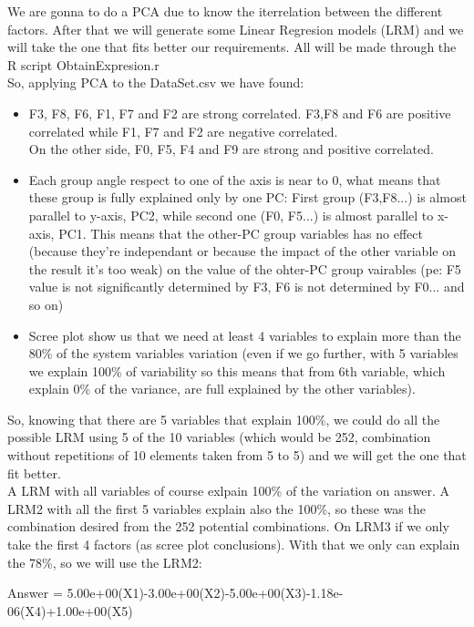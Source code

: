 \documentclass[12pt]{article}
\begin{document}
We are gonna to do a PCA due to know the iterrelation between the different factors. After that we will generate some Linear Regresion models (LRM) and we will take the one that fits better our requirements. All will be made through the R script ObtainExpresion.r\\
So, applying PCA to the DataSet.csv we have found:
\begin{itemize}
\item F3, F8, F6, F1, F7 and F2 are strong correlated. F3,F8 and F6 are positive correlated while F1, F7 and F2 are negative correlated.\\ On the other side, F0, F5, F4 and F9 are strong and positive correlated.
\item Each group angle respect to one of the axis is near to 0, what means that these group is fully explained only by one PC: First group (F3,F8...) is almost parallel to y-axis, PC2, while second one (F0, F5...) is almost parallel to x-axis, PC1. 
This means that the other-PC group variables has no effect (because they're independant or because the impact of the other variable on the result it's too weak) on the value of the ohter-PC group vairables (pe: F5 value is not significantly determined by F3, F6 is not determined by F0... and so on)
\item Scree plot show us that we need at least 4 variables to explain more than the 80\% of the system variables variation (even if we go further, with 5 variables we explain 100\% of variability so this means that from 6th variable, which explain 0\% of the variance, are full explained by the other variables).
\end{itemize}
So, knowing that there are 5 variables that explain 100\%, we could do all the possible LRM using 5 of the 10 variables (which would be 252, combination without repetitions of 10 elements taken from 5 to 5) and we will get the one that fit better. \\

A LRM with all variables of course exlpain 100\% of the variation on answer.
A LRM2 with all the first 5 variables explain also the 100\%, so these was the combination desired from the 252 potential combinations.
On LRM3 if we only take the first 4 factors (as scree plot conclusions). With that we only can explain the 78\%, so we will use the LRM2:

Answer = 5.00e+00(X1)-3.00e+00(X2)-5.00e+00(X3)-1.18e-06(X4)+1.00e+00(X5)
\end{document}

